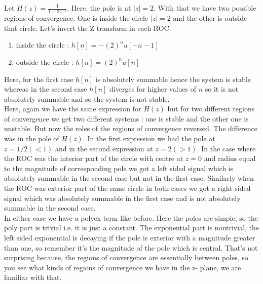 Let $H(z) = \frac{1}{1 - 2z^{-1}}$. Here, the pole is at $|z| = 2$. With that we have two possible regions of convergence. One is inside the circle $|z| = 2$ and the other is outside that circle. Let’s invert the Z transform in each ROC.

\begin{enumerate}
\item inside the circle : $h[n] = -\left(2\right)^nu[-n-1]$
\item outside the circle : $h[n] = \left(2\right)^nu[n]$
\end{enumerate}

Here, for the first case $h[n]$ is absolutely summable hence the system is stable whereas in the second case $h[n]$ diverges for higher values of $n$ so it is not absolutely summable and so the system is not stable.\\

Here, again we have the same expression for $H(z)$ but for two different regions of convergence we get two different systems : one is stable and the other one is unstable. But now the roles of the regions of convergence reversed. The difference was in the pole of $H(z)$. In the first expression we had the pole at $z = 1/2 (< 1)$ and in the second expression at $z = 2 (> 1)$. In the case where the ROC was the interior part of the circle with centre at $z = 0$ and radius equal to the magnitude of corresponding pole we got a left sided signal which is absolutely summable in the second case but not in the first case. Similarly when the ROC was exterior part of the same circle in both cases we got a right sided signal which was absolutely summable in the first case and is not absolutely summable in the second case.\\

In either case we have a polyex term like before. Here the poles are simple, so the poly part is trivial i.e. it is just a constant. The exponential part is nontrivial, the left sided exponential is decaying if the pole is exterior with a magnitude greater than one, so remember it's the magnitude of the pole which is central. That's not surprising because, the regions of convergence are essentially between poles, so you see what kinds of regions of convergence we have in the z- plane, we are familiar with that.\\

